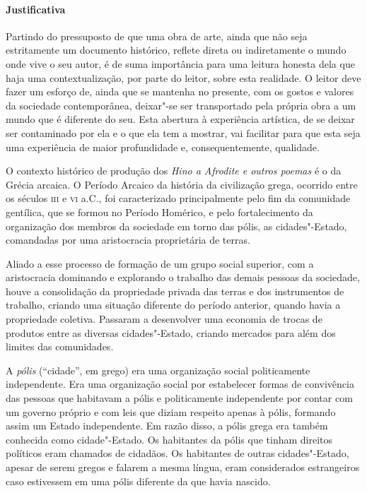 \documentclass[12pt]{extarticle}
\begin{document}
\paragraph{Justificativa} Partindo do pressuposto de que uma obra de arte, ainda
que não seja estritamente um documento histórico, reflete direta ou indiretamente
o mundo onde vive o seu autor, é de suma importância para uma leitura honesta
dela que haja uma contextualização, por parte do leitor, sobre esta realidade. 
O leitor deve fazer um esforço de, ainda que se mantenha no presente, com os
gostos e valores da sociedade contemporânea, deixar"-se ser transportado
pela própria obra a um mundo que é diferente do seu. Esta abertura à experiência
artística, de se deixar ser contaminado por ela e o que ela tem a mostrar,
vai facilitar para que esta seja uma experiência de maior profundidade e, 
consequentemente, qualidade. 

O contexto histórico de produção dos \emph{Hino a Afrodite e outros poemas} 
é o da Grécia arcaica. O Período Arcaico da história da civilização grega, 
ocorrido entre os séculos \textsc{iii} e \textsc{vi} a.C., foi caracterizado 
principalmente pelo fim da comunidade gentílica, que se formou no Período 
Homérico, e pelo fortalecimento da organização dos membros da sociedade em 
torno das pólis, as cidades"-Estado, comandadas por uma aristocracia proprietária de terras.

Aliado a esse processo de formação de um grupo social superior, com a aristocracia 
dominando e explorando o trabalho das demais pessoas da sociedade, houve a consolidação 
da propriedade privada das terras e dos instrumentos de trabalho, criando uma situação 
diferente do período anterior, quando havia a propriedade coletiva. Passaram a desenvolver 
uma economia de trocas de produtos entre as diversas cidades"-Estado, criando mercados para 
além dos limites das comunidades.

A \emph{pólis} (``cidade'', em grego) era uma organização social politicamente independente. 
Era uma organização social por estabelecer formas de convivência das pessoas que 
habitavam a pólis e politicamente independente por contar com um governo próprio 
e com leis que diziam respeito apenas à pólis, formando assim um Estado independente. 
Em razão disso, a pólis grega era também conhecida como cidade"-Estado. Os habitantes 
da pólis que tinham direitos políticos eram chamados de cidadãos. Os habitantes de outras 
cidades"-Estado, apesar de serem gregos e falarem a mesma língua, eram considerados 
estrangeiros caso estivessem em uma pólis diferente da que havia nascido.
\end{document}
